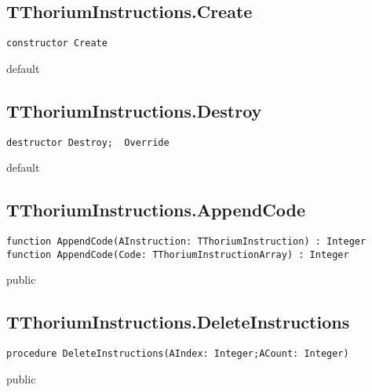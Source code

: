 \subsection{TThoriumInstructions.Create}
\label{thoriumcorepkg:thorium:tthoriuminstructions:create}
\begin{FPCList}
\Declaration 

\begin{verbatim}
constructor Create
\end{verbatim}
\Visibility
default
\end{FPCList}
\subsection{TThoriumInstructions.Destroy}
\label{thoriumcorepkg:thorium:tthoriuminstructions:destroy}
\begin{FPCList}
\Declaration 

\begin{verbatim}
destructor Destroy;  Override
\end{verbatim}
\Visibility
default
\end{FPCList}
\subsection{TThoriumInstructions.AppendCode}
\label{thoriumcorepkg:thorium:tthoriuminstructions:appendcode}
\begin{FPCList}
\Declaration 

\begin{verbatim}
function AppendCode(AInstruction: TThoriumInstruction) : Integer
function AppendCode(Code: TThoriumInstructionArray) : Integer
\end{verbatim}
\Visibility
public
\end{FPCList}
\subsection{TThoriumInstructions.DeleteInstructions}
\label{thoriumcorepkg:thorium:tthoriuminstructions:deleteinstructions}
\begin{FPCList}
\Declaration 

\begin{verbatim}
procedure DeleteInstructions(AIndex: Integer;ACount: Integer)
\end{verbatim}
\Visibility
public
\end{FPCList}
